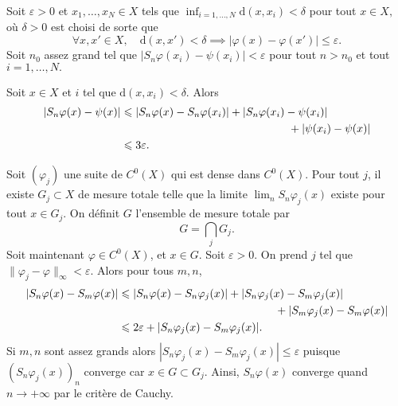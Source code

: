 \documentclass[a4paper,12pt,openany]{article}
\theoremstyle{plain}
\theoremstyle{definition}
\newcommand{\dd}{\mathrm{d}}
\begin{document}
\noindent Soit $\varepsilon > 0$ et $x_1, \dots, x_N \in X$ tels que $\inf_{i=1, \dots, N} \dd(x,x_i) < \delta$ pour tout $x \in X,$ o\`u $\delta > 0$ est choisi de sorte que
$$
\forall x, x' \in X, \quad \dd(x,x') < \delta \implies |\varphi(x)-\varphi(x')|\leqslant \varepsilon.
$$
Soit $n_0$ assez grand tel que $|S_n\varphi(x_i) - \psi(x_i)| < \varepsilon$ pour tout $n > n_0$ et tout $i = 1,\dots,N.$  

\noindent
Soit $x \in X$ et $i$ tel que $\dd(x,x_i) < \delta.$ Alors
$$
\begin{aligned}
|S_n\varphi(x) - \psi(x)|&\leqslant |S_n\varphi(x) - S_n\varphi(x_i)| + |S_n\varphi(x_i) - \psi(x_i)|  \\
& \hspace{4.6cm} \quad \quad + |\psi(x_i) - \psi(x)| \\
& \leqslant 3 \varepsilon.
\end{aligned}
$$

\vspace{0.6cm}

\newpage
{} \vspace{1.5mm} 

\noindent
Soit $(\varphi_j)$ une suite de $C^0(X)$ qui est dense dans $C^0(X)$.  Pour tout $j$, il existe $G_j \subset X$ de mesure totale telle que la limite $\lim_n S_n \varphi_j(x)$ existe pour tout $x\in G_j$.   
On d\'efinit $G$ l'ensemble de mesure totale par
$$
G = \bigcap_j G_j.
$$
Soit maintenant $\varphi \in C^0(X)$, et $x \in G.$ Soit $\varepsilon > 0.$ On prend $j$ tel que $\|\varphi_j - \varphi\|_\infty < \varepsilon.$  Alors pour tous $m,n$,
$$
\begin{aligned}
|S_n \varphi(x) - S_m \varphi(x)| &\leqslant |S_n\varphi(x) - S_n \varphi_j(x)| + |S_n\varphi_j(x) - S_m \varphi_j(x)| \\
& \hspace{4.6cm} \quad + |S_m \varphi_j(x) - S_m\varphi(x)|  \\
& \leqslant 2\varepsilon  + |S_n\varphi_j(x) - S_m\varphi_j(x)|.
\end{aligned}
$$
Si $m,n$ sont assez grands alors $|S_n\varphi_j(x) - S_m\varphi_j(x)| \leqslant \varepsilon$ puisque $(S_n\varphi_j(x))_n$ converge car $x \in G \subset G_j.$  
Ainsi, $S_n \varphi(x)$ converge quand $n \to +\infty$ par le crit\`ere de Cauchy.


\vspace{0.6cm} 
\end{document}
